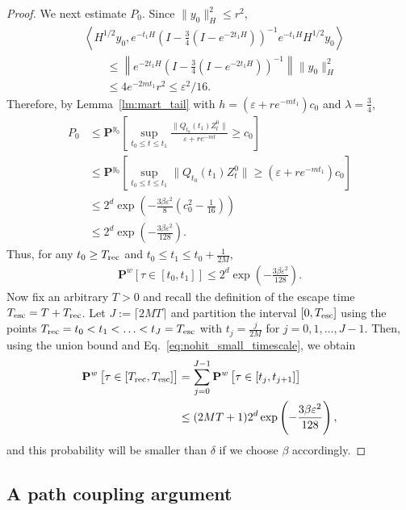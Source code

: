 \documentclass[final,12pt]{colt2018}
\numberwithin{equation}{section}
\numberwithin{equation}{section}
\def\PP{\mathbf{P}}
\def\Ave#1{\left\langle #1 \right\rangle}
\def\eps{\varepsilon}
\begin{document}
\begin{proof}
We next estimate $P_0$. Since $\|y_0\|^2_H \le r^2$,
	\begin{align*}
	& \Ave{H^{1/2}y_0,e^{-t_1H}\left(I - \frac{3}{4}(I-e^{-2t_1H})\right)^{-1}e^{-t_1H}H^{1/2}y_0} \nonumber\\
	&\qquad \le \left\| e^{-2t_1H} \left(I - \frac{3}{4}(I-e^{-2t_1H})\right)^{-1} \right\| \|y_0 \|^2_H \\
	&\qquad \le  4e^{-2m t_1} r^2 \le\eps^2/16.
	\end{align*}
Therefore, by Lemma~\ref{lm:mart_tail} with $h= (\eps + r e^{-mt_1})c_0$ and $\lambda = \frac{3}{4}$,
	\begin{align*}
		P_0 &  \leq \PP^{y_0}\left[\sup_{t_0 \le t \le t_1} \frac{\|Q_{t_0}(t_1)Z_t^0 \|}{\eps + r e^{-mt}} \ge c_0 \right]  \\
		& \leq \PP^{y_0}\left[\sup_{t_0 \le t \le t_1} \|Q_{t_0}(t_1)Z_t^0 \| \ge (\eps + r e^{-mt_1})c_0 \right] \\
		& \leq 2^d \exp\left( -\frac{3\beta\eps^2}{8}\left(c_0^2 - \frac{1}{16}\right)\right) \\
		& \le 2^d \exp\left(-\frac{3\beta\eps^2}{128}\right).
	\end{align*}
Thus, for any $t_0 \ge T_{\rm rec}$ and $t_0 \le t_1 \le t_0 + \frac{1}{2M}$,
\begin{align}\label{eq:nohit_small_timescale}
	\PP^{w}\left[ \tau \in [t_0,t_1]\right] \le 2^d \exp\left(-\frac{3\beta\eps^2}{128}\right).
\end{align}
Now fix an arbitrary $T > 0$ and recall the definition of the escape time $T_{\rm esc} = T + T_{\rm rec}$. Let $J:=\lceil 2MT \rceil$ and partition the interval $[0,T_{\rm esc}]$ using the points $T_{\rm rec} = t_0 < t_1 < \ldots < t_J = T_{\rm esc}$ with $t_j = \frac{j}{2M}$ for $j = 0, 1,\ldots, J-1$. Then, using the union bound and Eq.~\eqref{eq:nohit_small_timescale}, we obtain
	\begin{align*}
		\PP^{w}\left[ \tau \in [T_{\rm rec}, T_{\rm esc}]  \right] &= \sum^{J-1}_{j=0} \PP^{w}\left[\tau \in [t_j,t_{j+1}]\right] \\
		& \leq (2M T +1) 2^d \exp\left(-\frac{3\beta\eps^2}{128}\right),
	\end{align*}
and this probability will be smaller than $\delta$ if we choose $\beta$ accordingly.
\end{proof}

\subsection{A path coupling argument}
\end{document}
